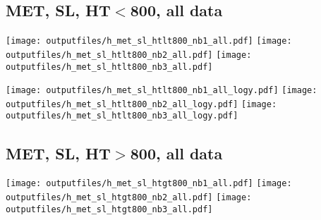 \documentclass[11pt]{article}
\begin{document}






     \subsection{ MET, SL, HT$<$800, all data}

    \noindent
     \texttt{[image: outputfiles/h\_met\_sl\_htlt800\_nb1\_all.pdf]}
     \texttt{[image: outputfiles/h\_met\_sl\_htlt800\_nb2\_all.pdf]}
     \texttt{[image: outputfiles/h\_met\_sl\_htlt800\_nb3\_all.pdf]}

    \noindent
     \texttt{[image: outputfiles/h\_met\_sl\_htlt800\_nb1\_all\_logy.pdf]}
     \texttt{[image: outputfiles/h\_met\_sl\_htlt800\_nb2\_all\_logy.pdf]}
     \texttt{[image: outputfiles/h\_met\_sl\_htlt800\_nb3\_all\_logy.pdf]}


     \subsection{ MET, SL, HT$>$800, all data}

    \noindent
     \texttt{[image: outputfiles/h\_met\_sl\_htgt800\_nb1\_all.pdf]}
     \texttt{[image: outputfiles/h\_met\_sl\_htgt800\_nb2\_all.pdf]}
     \texttt{[image: outputfiles/h\_met\_sl\_htgt800\_nb3\_all.pdf]}
\end{document}
